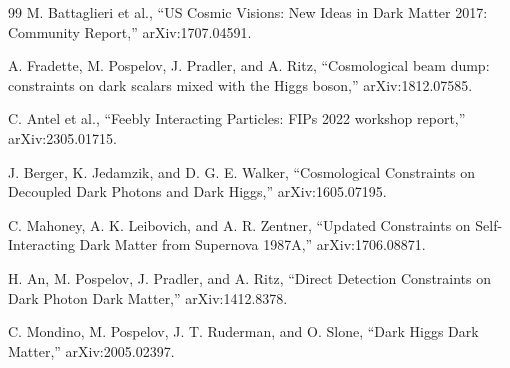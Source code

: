 \documentclass[11pt]{article}
\begin{document}
\begin{thebibliography}{99}
M. Battaglieri et al.,
``US Cosmic Visions: New Ideas in Dark Matter 2017: Community Report,''
arXiv:1707.04591.

A. Fradette, M. Pospelov, J. Pradler, and A. Ritz,
``Cosmological beam dump: constraints on dark scalars mixed with the Higgs boson,''
arXiv:1812.07585.

C. Antel et al.,
``Feebly Interacting Particles: FIPs 2022 workshop report,''
arXiv:2305.01715.

J. Berger, K. Jedamzik, and D. G. E. Walker,
``Cosmological Constraints on Decoupled Dark Photons and Dark Higgs,''
arXiv:1605.07195.

C. Mahoney, A. K. Leibovich, and A. R. Zentner,
``Updated Constraints on Self-Interacting Dark Matter from Supernova 1987A,''
arXiv:1706.08871.

H. An, M. Pospelov, J. Pradler, and A. Ritz,
``Direct Detection Constraints on Dark Photon Dark Matter,''
arXiv:1412.8378.

C. Mondino, M. Pospelov, J. T. Ruderman, and O. Slone,
``Dark Higgs Dark Matter,''
arXiv:2005.02397.

\end{thebibliography}
\end{document}
